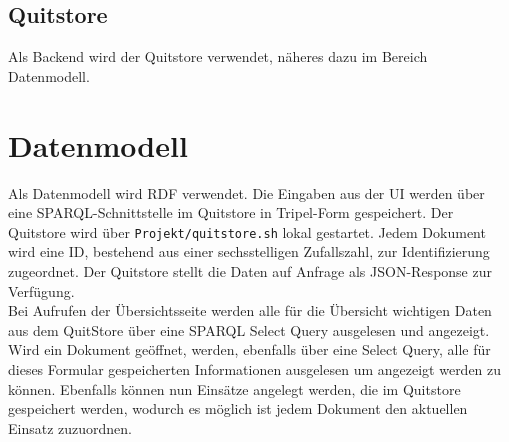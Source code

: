 \documentclass[a4paper,11pt,oneside, titlepage]{article}
\begin{document}
\subsection{Quitstore}
Als Backend wird der Quitstore verwendet, näheres dazu im Bereich Datenmodell.
\section{Datenmodell}
Als Datenmodell wird \gls{RDF} verwendet. Die Eingaben aus der UI werden über eine \gls{SPARQL}-Schnittstelle im \gls{Quitstore} in Tripel-Form gespeichert.  Der Quitstore wird über \verb+Projekt/quitstore.sh+ lokal gestartet. Jedem Dokument wird eine ID, bestehend aus einer sechsstelligen Zufallszahl, zur Identifizierung zugeordnet. Der Quitstore stellt die Daten auf Anfrage als \gls{JSON}-Response zur Verfügung. \\ Bei Aufrufen der Übersichtsseite werden alle für die Übersicht wichtigen Daten aus dem QuitStore über eine SPARQL Select Query ausgelesen und angezeigt. Wird ein Dokument geöffnet, werden, ebenfalls über eine Select Query, alle für dieses Formular gespeicherten Informationen ausgelesen um angezeigt werden zu können. Ebenfalls können nun Einsätze angelegt werden, die im Quitstore gespeichert werden, wodurch es möglich ist jedem Dokument den aktuellen Einsatz zuzuordnen.

\newpage
\printglossaries
\end{document}

